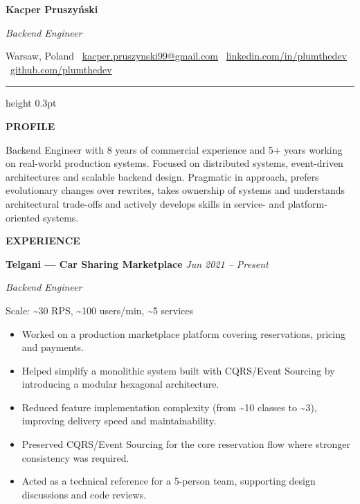 \documentclass[9pt,a4paper]{article}
\newcommand{\cvsection}[1]{%
  \vspace{8pt}%
  {\bfseries #1}\par
  \vspace{4pt}%
}
\newcommand{\cvhr}{%
  \par\vspace*{8pt}%
  \hrule height 0.3pt%
  \vspace*{0pt}%
}
\newcommand{\cvrole}[2]{%
  \textbf{#1} \hfill \textit{#2}\par
}
\newcommand{\cvsubtitle}[1]{%
  \textit{#1}\par
}
\begin{document}
\pagestyle{empty}

{\Large \textbf{Kacper Pruszyński}}\par
\textit{Backend Engineer}\par
\vspace*{4pt}

Warsaw, Poland \textbar\
\href{mailto:kacper.pruszynski99@gmail.com}{kacper.pruszynski99@gmail.com} \textbar\
\href{https://www.linkedin.com/in/plumthedev}{linkedin.com/in/plumthedev} \textbar\
\href{https://github.com/plumthedev}{github.com/plumthedev}

\cvhr

\cvsection{PROFILE}
Backend Engineer with 8 years of commercial experience and 5+ years working on real-world production systems.
Focused on distributed systems, event-driven architectures and scalable backend design.
Pragmatic in approach, prefers evolutionary changes over rewrites, takes ownership of systems and understands architectural trade-offs
and actively develops skills in service- and platform-oriented systems.

\cvsection{EXPERIENCE}

\cvrole{Telgani — Car Sharing Marketplace}{Jun 2021 -- Present}
\cvsubtitle{Backend Engineer}
Scale: \textasciitilde30 RPS, \textasciitilde100 users/min, \textasciitilde5 services
\begin{itemize}
  \item Worked on a production marketplace platform covering reservations, pricing and payments.
  \item Helped simplify a monolithic system built with CQRS/Event Sourcing by introducing a modular hexagonal architecture.
  \item Reduced feature implementation complexity (from \textasciitilde10 classes to \textasciitilde3), improving delivery speed and maintainability.
  \item Preserved CQRS/Event Sourcing for the core reservation flow where stronger consistency was required.
  \item Acted as a technical reference for a 5-person team, supporting design discussions and code reviews.
\end{itemize}
\vspace*{4pt}
\end{document}
